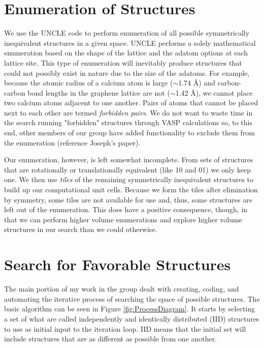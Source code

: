 \documentclass[oneside, noacknowlegments]{BYUPhys}
\begin{document}
\section{Enumeration of Structures}

We use the UNCLE code to perform enumeration of all possible 
symmetrically inequivalent structures in a given space. UNCLE 
performs a solely mathematical enumeration based on the shape of 
the lattice and the adatom options at each lattice site. This type 
of enumeration will inevitably produce structures that could not 
possibly exist in nature due to the size of the adatoms. For 
example, because the atomic radius of a calcium atom is large ($
\sim$1.74 \AA) and carbon-carbon bond lengths in the graphene 
lattice are not ($\sim$1.42 \AA), we cannot place two calcium atoms 
adjacent to one another. Pairs of atoms that cannot be placed next 
to each other are termed \textit{forbidden pairs}. We do not want 
to waste time in the search running "forbidden" structures through 
VASP calculations so, to this end, other members of our group have 
added functionality to exclude them from the enumeration (reference 
Joseph's paper). 

Our enumeration, however, is left somewhat incomplete. From sets of 
structures that are rotationally or translationally equivalent 
(like 10 and 01) we only keep one. We then use \textit{tiles} of 
the remaining symmetrically inequivalent structures to build up our 
computational unit cells. Because we form the tiles after 
elimination by symmetry, some tiles are not available for use and, 
thus, some structures are left out of the enumeration. This does 
have a positive consequence, though, in that we can perform higher 
volume enumerations and explore higher volume structures in our 
search than we could otherwise.

\section{Search for Favorable Structures}

The main portion of my work in the group dealt with creating, 
coding, and automating the iterative process of searching the space 
of possible structures. The basic algorithm can be seen in Figure 
\ref{fig:ProcessDiagram}. It starts by selecting a set of what are 
called independently and identically distributed (IID) structures 
to use as initial input to the iteration loop. IID means that the 
initial set will include structures that are as different as 
possible from one another.
\end{document}
